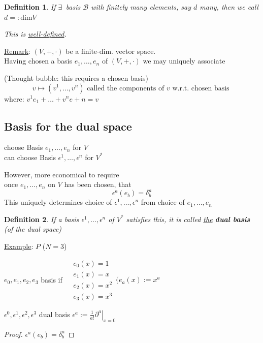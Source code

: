 \documentclass[10pt]{amsart}
\newtheorem{definition}{Definition}
\begin{document}
\begin{multicols*}{2}
\begin{definition}
	If $\exists \, $ basis $\mathcal{B}$ with finitely many elements, say $d$ many, then we call $d =:\text{dim}{V}$
	
	This is \underline{well-defined}.
\end{definition}

\underline{Remark}: $(V,+,\cdot)$ be a finite-dim. vector space.   \\
Having chosen a basis $e_1, \dots, e_n$ of $(V,+,\cdot)$ we may uniquely associate

(Thought bubble: this requires a chosen basis)
\[
v \mapsto (v^1 , \dots , v^n)  \text{ called the components of $v$ w.r.t. chosen basis }
\]
where: $v^1 e_1 + \dots + v^n e+n = v$

\subsection{Basis for the dual space}

choose Basis $e_1, \dots, e_n$ for $V$ \\
can choose Basis $\epsilon^1, \dots , \epsilon^n$ for $V^*$

However, more economical to require \\
once $e_1 , \dots , e_n$ on $V$ has been chosen, that
\[
\epsilon^a(e_b) = \delta^a_b
\]
This uniquely determines choice of $\epsilon^1, \dots , \epsilon^n$ from choice of $e_1, \dots , e_n$

\begin{definition}
	If a basis $\epsilon^1, \dots , \epsilon^n$ of $V^*$ satisfies this, it is called \underline{the} \textbf{dual basis} (of the dual space)
\end{definition}

\underline{Example}: $P$ ($N=3$)

$e_0, e_1, e_2, e_3$ basis if $\begin{aligned} & e_0(x) = 1 \\ 
& e_1(x) = x \\ 
& e_2(x) = x^2 \\ 
& e_3(x) = x^3 \end{aligned} \lbrace e_a(x):=x^a$

$\epsilon^0, \epsilon^1, \epsilon^2, \epsilon^3$ dual basis $\epsilon^a := \frac{1}{a!} \left. \partial^a \right|_{x=0}$

\begin{proof}
	$\epsilon^a(e_b) = \delta^a_b$
\end{proof}


\end{multicols*}
\end{document}
